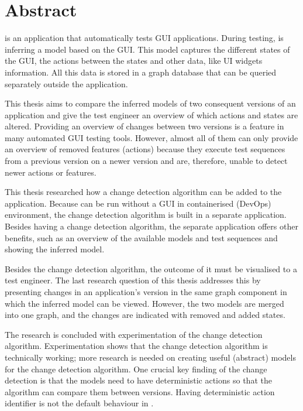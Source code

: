 \chapter*{Abstract}

\testar is an application that automatically tests GUI applications. During testing, \testar is inferring a model based on the GUI. This model captures the different states of the GUI, the actions between the states and other data, like UI widgets information. All this data is stored in a graph database that can be queried separately outside the \testar application. 

This thesis aims to compare the inferred models of two consequent versions of an application and give the test engineer an overview of which actions and states are altered. Providing an overview of changes between two versions is a feature in many automated GUI testing tools. However, almost all of them can only provide an overview of removed features (actions) because they execute test sequences from a previous version on a newer version and are, therefore, unable to detect newer actions or features. 

This thesis researched how a change detection algorithm can be added to the \testar application. Because \testar can be run without a GUI in containerised (DevOps) environment, the change detection algorithm is built in a separate application. Besides having a change detection algorithm, the separate application offers other benefits, such as an overview of the available models and test sequences and showing the inferred model.

Besides the change detection algorithm, the outcome of it must be visualised to a test engineer. The last research question of this thesis addresses this by presenting changes in an application's version in the same graph component in which the inferred model can be viewed. However, the two models are merged into one graph, and the changes are indicated with removed and added states.  

The research is concluded with experimentation of the change detection algorithm. Experimentation shows that the change detection algorithm is technically working; more research is needed on creating useful (abstract) models for the change detection algorithm. One crucial key finding of the change detection is that the models need to have deterministic actions so that the algorithm can compare them between versions. Having deterministic action identifier is not the default behaviour in \testar. 